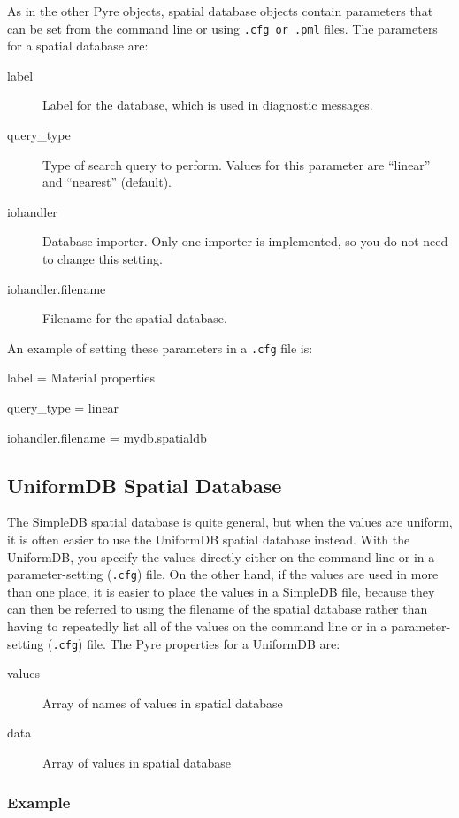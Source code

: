 As in the other Pyre objects, spatial database objects contain parameters
that can be set from the command line or using \texttt{.cfg or .pml}
files. The parameters for a spatial database are:
\begin{description}
\item [{label}] Label for the database, which is used in diagnostic messages.
\item [{query\_type}] Type of search query to perform. Values for this
parameter are ``linear'' and ``nearest'' (default).
\item [{iohandler}] Database importer. Only one importer is implemented,
so you do not need to change this setting.
\item [{iohandler.filename}] Filename for the spatial database.
\end{description}
An example of setting these parameters in a \texttt{.cfg} file is:
\begin{lyxcode}
label = Material properties

query\_type = linear

iohandler.filename = mydb.spatialdb


\end{lyxcode}

\subsection{UniformDB Spatial Database}

The SimpleDB spatial database is quite general, but when the values
are uniform, it is often easier to use the UniformDB spatial database
instead. With the UniformDB, you specify the values directly either
on the command line or in a parameter-setting (\texttt{.cfg}) file.
On the other hand, if the values are used in more than one place,
it is easier to place the values in a SimpleDB file, because they
can then be referred to using the filename of the spatial database
rather than having to repeatedly list all of the values on the command
line or in a parameter-setting (\texttt{.cfg}) file. The Pyre properties
for a UniformDB are:
\begin{description}
\item [{values}] Array of names of values in spatial database
\item [{data}] Array of values in spatial database
\end{description}

\subsubsection{Example}

